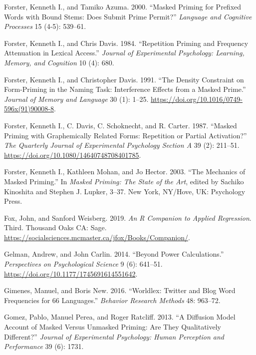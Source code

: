 \documentclass[
]{interact}
\newlength{\cslhangindent}
\newenvironment{CSLReferences}[2] %
 {\begin{list}{}{%
  \setlength{\itemindent}{0pt}
  \setlength{\leftmargin}{0pt}
  \setlength{\parsep}{0pt}
  \ifodd #1
   \setlength{\leftmargin}{\cslhangindent}
   \setlength{\itemindent}{-1\cslhangindent}
  \fi
  \setlength{\itemsep}{#2\baselineskip}}}
 {\end{list}}
\begin{document}
\begin{CSLReferences}{1}{0}
Forster, Kenneth I., and Tamiko Azuma. 2000. {``Masked Priming for
Prefixed Words with Bound Stems: Does Submit Prime Permit?''}
\emph{Language and Cognitive Processes} 15 (4-5): 539--61.

Forster, Kenneth I., and Chris Davis. 1984. {``Repetition Priming and
Frequency Attenuation in Lexical Access.''} \emph{Journal of
Experimental Psychology: Learning, Memory, and Cognition} 10 (4): 680.

Forster, Kenneth I., and Christopher Davis. 1991. {``The Density
Constraint on Form-Priming in the Naming Task: Interference Effects from
a Masked Prime.''} \emph{Journal of Memory and Language} 30 (1): 1--25.
\url{https://doi.org/10.1016/0749-596x(91)90008-8}.

Forster, Kenneth I., C. Davis, C. Schoknecht, and R. Carter. 1987.
{``Masked Priming with Graphemically Related Forms: Repetition or
Partial Activation?''} \emph{The Quarterly Journal of Experimental
Psychology Section A} 39 (2): 211--51.
\url{https://doi.org/10.1080/14640748708401785}.

Forster, Kenneth I., Kathleen Mohan, and Jo Hector. 2003. {``The
Mechanics of Masked Priming.''} In \emph{Masked Priming: The State of
the Art}, edited by Sachiko Kinoshita and Stephen J. Lupker, 3--37. New
York, NY/Hove, UK: Psychology Press.

Fox, John, and Sanford Weisberg. 2019. \emph{An {R} Companion to Applied
Regression}. Third. Thousand Oaks {CA}: Sage.
\url{https://socialsciences.mcmaster.ca/jfox/Books/Companion/}.

Gelman, Andrew, and John Carlin. 2014. {``Beyond Power Calculations.''}
\emph{Perspectives on Psychological Science} 9 (6): 641--51.
\url{https://doi.org/10.1177/1745691614551642}.

Gimenes, Manuel, and Boris New. 2016. {``Worldlex: Twitter and Blog Word
Frequencies for 66 Languages.''} \emph{Behavior Research Methods} 48:
963--72.

Gomez, Pablo, Manuel Perea, and Roger Ratcliff. 2013. {``A Diffusion
Model Account of Masked Versus Unmasked Priming: Are They Qualitatively
Different?''} \emph{Journal of Experimental Psychology: Human Perception
and Performance} 39 (6): 1731.


\end{CSLReferences}
\end{document}
